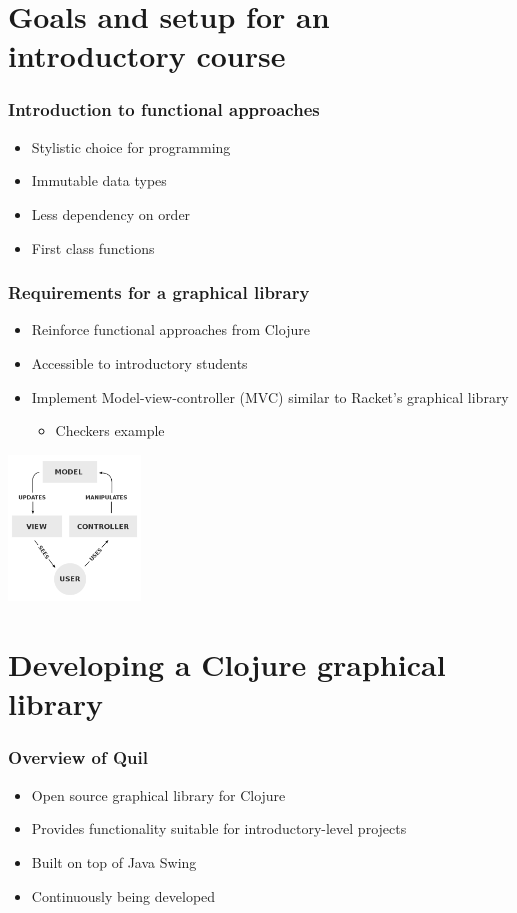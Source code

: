 \documentclass{beamer}
\newcommand{\comment}[1]{{\bf \tt  {#1}}}
\newcommand{\pscomment}[1]{\textcolor{red}{\comment{Paul: {#1}}}}
\begin{document}
\section{Goals and setup for an introductory course}

\begin{frame}
\frametitle{Introduction to functional approaches}
\begin{itemize}
\item Stylistic choice for programming
\item Immutable data types
\item Less dependency on order
\item First class functions
\end{itemize}
\end{frame}

\begin{frame}
\frametitle{Requirements for a graphical library}
\begin{itemize}
\item Reinforce functional approaches from Clojure
\item Accessible to introductory students
\item Implement Model-view-controller (MVC) similar to Racket's graphical library
	\begin{itemize}
	\item Checkers example
	\end{itemize}
\end{itemize}
\begin{center}
\includegraphics[width=100pt]{MVC-Process}
\end{center}
\end{frame}

\section{Developing a Clojure graphical library}

\begin{frame}
\frametitle{Overview of Quil}
\begin{itemize}
\item Open source graphical library for Clojure
\item Provides functionality suitable for introductory-level projects
\item Built on top of Java Swing
\item Continuously being developed
\end{itemize}
\end{frame}
\end{document}
